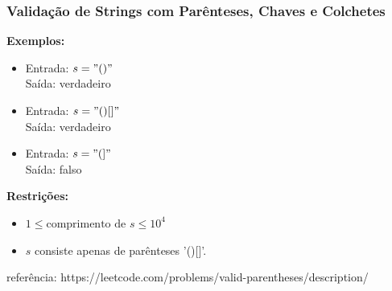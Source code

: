 \begin{frame}[fragile]
  \frametitle{Validação de Strings com Parênteses, Chaves e Colchetes}

  \textbf{Exemplos:}
  \begin{itemize}
    \item Entrada: \(s = "()"\) \\
          Saída: verdadeiro
    \item Entrada: \(s = "()[]{}"\) \\
          Saída: verdadeiro
    \item Entrada: \(s = "(]"\) \\
          Saída: falso
  \end{itemize}

  \textbf{Restrições:}
  \begin{itemize}
    \item \(1 \leq \text{comprimento de } s \leq 10^4\)
    \item \(s\) consiste apenas de parênteses '()[]{}'.
  \end{itemize}
  \tiny 
  referência: https://leetcode.com/problems/valid-parentheses/description/
\end{frame}


